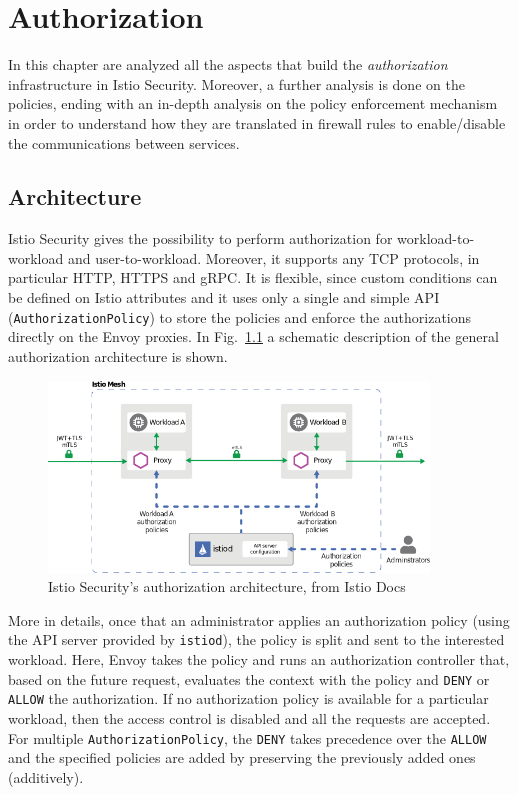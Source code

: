 \chapter{Authorization}
In this chapter are analyzed all the aspects that build the \textit{authorization} infrastructure in Istio Security. Moreover, a further analysis is done on the policies, ending with an in-depth analysis on the policy enforcement mechanism in order to understand how they are translated in firewall rules to enable/disable the communications between services.
\minitoc

\section{Architecture}
Istio Security gives the possibility to perform authorization for workload-to-workload and user-to-workload. Moreover, it supports any TCP protocols, in particular HTTP, HTTPS and gRPC. It is flexible, since custom conditions can be defined on Istio attributes and it uses only a single and simple API (\texttt{AuthorizationPolicy}) to store the policies and enforce the authorizations directly on the Envoy proxies.
In Fig.~\ref{fig:archauthz} a schematic description of the general authorization architecture is shown.

\begin{figure}[ht]
    \centering
    \includegraphics[width=0.9\textwidth]{chapters/images/chp3/arch-authz.png}
    \caption{Istio Security's authorization architecture, from Istio Docs}
    \label{fig:archauthz}
\end{figure}

More in details, once that an administrator applies an authorization policy (using the API server provided by \texttt{istiod}), the policy is split and sent to the interested workload. Here, Envoy takes the policy and runs an authorization controller that, based on the future request, evaluates the context with the policy and \texttt{DENY} or \texttt{ALLOW} the authorization. If no authorization policy is available for a particular workload, then the access control is disabled and all the requests are accepted. For multiple \texttt{AuthorizationPolicy}, the \texttt{DENY} takes precedence over the \texttt{ALLOW} and the specified policies are added by preserving the previously added ones (additively).

